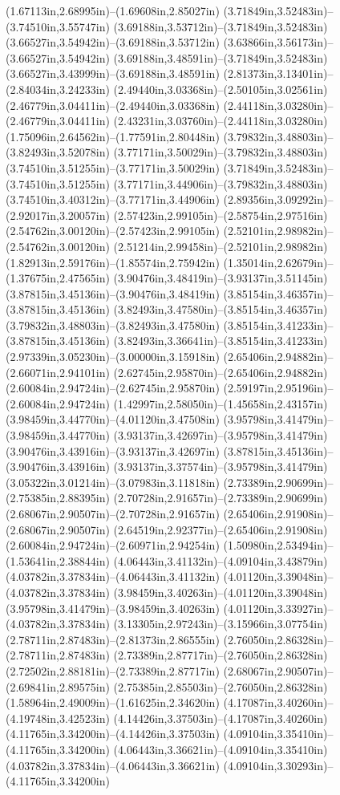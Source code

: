(1.67113in,2.68995in)--(1.69608in,2.85027in) (3.71849in,3.52483in)--(3.74510in,3.55747in) (3.69188in,3.53712in)--(3.71849in,3.52483in) (3.66527in,3.54942in)--(3.69188in,3.53712in) (3.63866in,3.56173in)--(3.66527in,3.54942in) (3.69188in,3.48591in)--(3.71849in,3.52483in) (3.66527in,3.43999in)--(3.69188in,3.48591in) (2.81373in,3.13401in)--(2.84034in,3.24233in) (2.49440in,3.03368in)--(2.50105in,3.02561in) (2.46779in,3.04411in)--(2.49440in,3.03368in) (2.44118in,3.03280in)--(2.46779in,3.04411in) (2.43231in,3.03760in)--(2.44118in,3.03280in) (1.75096in,2.64562in)--(1.77591in,2.80448in) (3.79832in,3.48803in)--(3.82493in,3.52078in) (3.77171in,3.50029in)--(3.79832in,3.48803in) (3.74510in,3.51255in)--(3.77171in,3.50029in) (3.71849in,3.52483in)--(3.74510in,3.51255in) (3.77171in,3.44906in)--(3.79832in,3.48803in) (3.74510in,3.40312in)--(3.77171in,3.44906in) (2.89356in,3.09292in)--(2.92017in,3.20057in) (2.57423in,2.99105in)--(2.58754in,2.97516in) (2.54762in,3.00120in)--(2.57423in,2.99105in) (2.52101in,2.98982in)--(2.54762in,3.00120in) (2.51214in,2.99458in)--(2.52101in,2.98982in) (1.82913in,2.59176in)--(1.85574in,2.75942in) (1.35014in,2.62679in)--(1.37675in,2.47565in) (3.90476in,3.48419in)--(3.93137in,3.51145in) (3.87815in,3.45136in)--(3.90476in,3.48419in) (3.85154in,3.46357in)--(3.87815in,3.45136in) (3.82493in,3.47580in)--(3.85154in,3.46357in) (3.79832in,3.48803in)--(3.82493in,3.47580in) (3.85154in,3.41233in)--(3.87815in,3.45136in) (3.82493in,3.36641in)--(3.85154in,3.41233in) (2.97339in,3.05230in)--(3.00000in,3.15918in) (2.65406in,2.94882in)--(2.66071in,2.94101in) (2.62745in,2.95870in)--(2.65406in,2.94882in) (2.60084in,2.94724in)--(2.62745in,2.95870in) (2.59197in,2.95196in)--(2.60084in,2.94724in) (1.42997in,2.58050in)--(1.45658in,2.43157in) (3.98459in,3.44770in)--(4.01120in,3.47508in) (3.95798in,3.41479in)--(3.98459in,3.44770in) (3.93137in,3.42697in)--(3.95798in,3.41479in) (3.90476in,3.43916in)--(3.93137in,3.42697in) (3.87815in,3.45136in)--(3.90476in,3.43916in) (3.93137in,3.37574in)--(3.95798in,3.41479in) (3.05322in,3.01214in)--(3.07983in,3.11818in) (2.73389in,2.90699in)--(2.75385in,2.88395in) (2.70728in,2.91657in)--(2.73389in,2.90699in) (2.68067in,2.90507in)--(2.70728in,2.91657in) (2.65406in,2.91908in)--(2.68067in,2.90507in) (2.64519in,2.92377in)--(2.65406in,2.91908in) (2.60084in,2.94724in)--(2.60971in,2.94254in) (1.50980in,2.53494in)--(1.53641in,2.38844in) (4.06443in,3.41132in)--(4.09104in,3.43879in) (4.03782in,3.37834in)--(4.06443in,3.41132in) (4.01120in,3.39048in)--(4.03782in,3.37834in) (3.98459in,3.40263in)--(4.01120in,3.39048in) (3.95798in,3.41479in)--(3.98459in,3.40263in) (4.01120in,3.33927in)--(4.03782in,3.37834in) (3.13305in,2.97243in)--(3.15966in,3.07754in) (2.78711in,2.87483in)--(2.81373in,2.86555in) (2.76050in,2.86328in)--(2.78711in,2.87483in) (2.73389in,2.87717in)--(2.76050in,2.86328in) (2.72502in,2.88181in)--(2.73389in,2.87717in) (2.68067in,2.90507in)--(2.69841in,2.89575in) (2.75385in,2.85503in)--(2.76050in,2.86328in) (1.58964in,2.49009in)--(1.61625in,2.34620in) (4.17087in,3.40260in)--(4.19748in,3.42523in) (4.14426in,3.37503in)--(4.17087in,3.40260in) (4.11765in,3.34200in)--(4.14426in,3.37503in) (4.09104in,3.35410in)--(4.11765in,3.34200in) (4.06443in,3.36621in)--(4.09104in,3.35410in) (4.03782in,3.37834in)--(4.06443in,3.36621in) (4.09104in,3.30293in)--(4.11765in,3.34200in) 